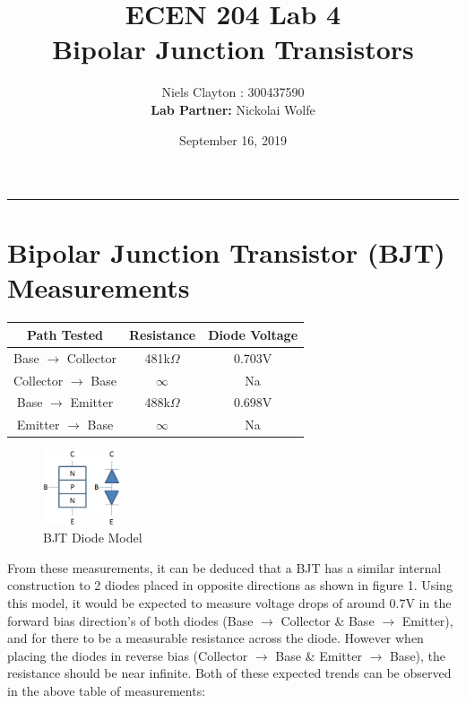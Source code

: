 \documentclass[a4paper,11pt]{article}
\begin{document}
\title{\LARGE{\textbf{ECEN 204 Lab 4}\\Bipolar Junction Transistors}}
\author{Niels Clayton : 300437590\\ \textbf{Lab Partner: }Nickolai Wolfe}
\date{September 16, 2019}
\maketitle
\hrule

\section{Bipolar Junction Transistor (BJT) Measurements}

\begin{center}
\begin{tabular}{|c|c|c|}  
\hline
 Path Tested & Resistance  & Diode Voltage\\
\hline
Base \(\displaystyle \rightarrow \) Collector & 481k\(\displaystyle \Omega \) & 0.703V\\
Collector \(\displaystyle \rightarrow \) Base & \(\displaystyle \infty  \) & Na\\
\hline
Base \(\displaystyle \rightarrow \) Emitter & 488k\(\displaystyle \Omega \) & 0.698V\\
Emitter \(\displaystyle \rightarrow \) Base & \(\displaystyle \infty  \) & Na\\

\hline
\end{tabular}
\end{center}

\begin{figure}
\vspace{-40pt}
\begin{center}
\includegraphics[width=0.2\textwidth]{BJT-diode.png}
\end{center}
\vspace{-18pt}
\caption{BJT Diode Model}
\end{figure}

From these measurements, it can be deduced that a BJT has a similar internal construction to 2 diodes placed in opposite directions as shown in figure 1. Using this model, it would be expected to measure voltage drops of around 0.7V in the forward bias direction's of both diodes (Base $\rightarrow$ Collector \& Base $\rightarrow$ Emitter), and for there to be a measurable resistance across the diode. However when placing the diodes in reverse bias (Collector $\rightarrow$ Base \& Emitter $\rightarrow$ Base), the resistance should be near infinite. Both of these expected trends can be observed in the above table of measurements:
\end{document}

